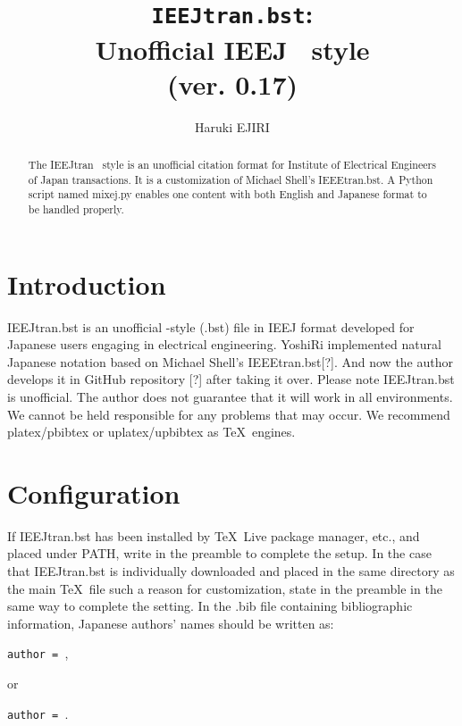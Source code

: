 \documentclass[11pt, a4paper, dvipdfmx]{article}
\title{\texttt{IEEJtran.bst}:\\Unofficial IEEJ \BibTeX\ style\\(ver. 0.17)}
\author{Haruki EJIRI}
\begin{document}
\maketitle

\begin{abstract}
The IEEJtran \BibTeX\ style is an unofficial citation format for Institute of Electrical Engineers of Japan transactions.
It is a customization of Michael Shell's IEEEtran.bst.
A Python script named mixej.py enables one content with both English and Japanese format to be handled properly.
\end{abstract}


\section{Introduction}

IEEJtran.bst is an unofficial \BibTeX-style (.bst) file in IEEJ format developed for Japanese users engaging in electrical engineering.
YoshiRi implemented natural Japanese notation based on Michael Shell's IEEEtran.bst[?].
And now the author develops it in GitHub repository [?] after taking it over.
Please note IEEJtran.bst is unofficial.
The author does not guarantee that it will work in all environments.
We cannot be held responsible for any problems that may occur.
We recommend platex/pbibtex or uplatex/upbibtex as \TeX\ engines.


\section{Configuration}

If IEEJtran.bst has been installed by \TeX\ Live package manager, etc., and placed under PATH, write \texttt{\string{}} in the preamble to complete the setup.
In the case that IEEJtran.bst is individually downloaded and placed in the same directory as the main \TeX\ file such a reason for customization, state \texttt{\string{}} in the preamble in the same way to complete the setting.
In the .bib file containing bibliographic information, Japanese authors' names should be written as:
\begin{center}
\texttt{author = },
\end{center}
or
\begin{center}
\texttt{author = }.
\end{center}
\end{document}
